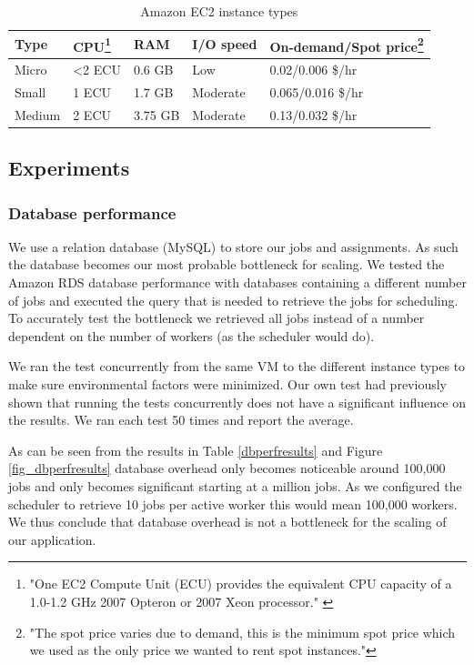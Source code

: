 \documentclass[a4paper]{IEEEtran}
\begin{document}
\begin{savenotes}
\begin{table}
\centering

\begin{tabular}{| l | l | l | l | l |}
\hline
Type & CPU\footnote{"One EC2 Compute Unit (ECU) provides the equivalent CPU capacity of a 1.0-1.2 GHz 2007 Opteron or 2007 Xeon processor." \cite{amazonecu}} & RAM & I/O speed & On-demand/Spot price\footnote{"The spot price varies due to demand, this is the minimum spot price which we used as the only price we wanted to rent spot instances."} \\ \hline
Micro & \textless 2 ECU & 0.6 GB & Low & 0.02/0.006 \$/hr \\ \hline
Small & 1 ECU & 1.7 GB & Moderate & 0.065/0.016 \$/hr \\ \hline
Medium & 2 ECU & 3.75 GB & Moderate & 0.13/0.032 \$/hr \\ \hline
\end{tabular}

\caption{Amazon EC2 instance types}
\label{amazoninstancespec}
\end{table}
\end{savenotes}

\subsection{Experiments}

\subsubsection{Database performance}

We use a relation database (MySQL) to store our jobs and assignments. As such the database becomes our most probable bottleneck for scaling. We tested the Amazon RDS database performance with databases containing a different number of jobs and executed the query that is needed to retrieve the jobs for scheduling. To accurately test the bottleneck we retrieved all jobs instead of a number dependent on the number of workers (as the scheduler would do).

We ran the test concurrently from the same VM to the different instance types to make sure environmental factors were minimized. Our own test had previously shown that running the tests concurrently does not have a significant influence on the results. We ran each test 50 times and report the average.

As can be seen from the results in Table \ref{dbperfresults} and Figure \ref{fig_dbperfresults} database overhead only becomes noticeable around 100,000 jobs and only becomes significant starting at a million jobs. As we configured the scheduler to retrieve 10 jobs per active worker this would mean 100,000 workers. We thus conclude that database overhead is not a bottleneck for the scaling of our application.
\end{document}
